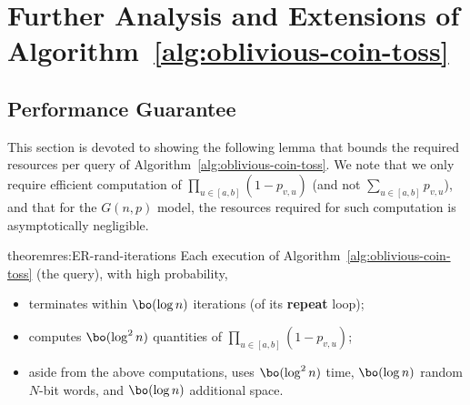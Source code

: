 \section{Further Analysis and Extensions of Algorithm~\ref{alg:oblivious-coin-toss}}
\label{sec:reroll-cont}

\subsection{Performance Guarantee}
This section is devoted to showing the following lemma that bounds the required resources per query of Algorithm~\ref{alg:oblivious-coin-toss}. We note that we only require efficient computation of $\prod_{u \in [a,b]} (1-p_{v,u})$ (and not $\sum_{u \in [a,b]} p_{v,u}$), and that for the $G(n,p)$ model, the resources required for such computation is asymptotically negligible.

\begin{restatable}{theorem}{res:ER-rand-iterations}\label{thm:ER-rand-iterations}
Each execution of Algorithm~\ref{alg:oblivious-coin-toss} (the  query), with high probability,
\begin{itemize}
\item terminates within $\bo(\log n)$ iterations (of its \textup{\textbf{repeat}} loop);
\item computes $\bo(\log^2 n)$ quantities of $\prod_{u \in [a,b]} (1-p_{v,u})$;
\item aside from the above computations, uses $\bo(\log^2 n)$ time, $\bo(\log n)$ random $N$-bit words, and $\bo(\log n)$ additional space.
\end{itemize}
\end{restatable}

